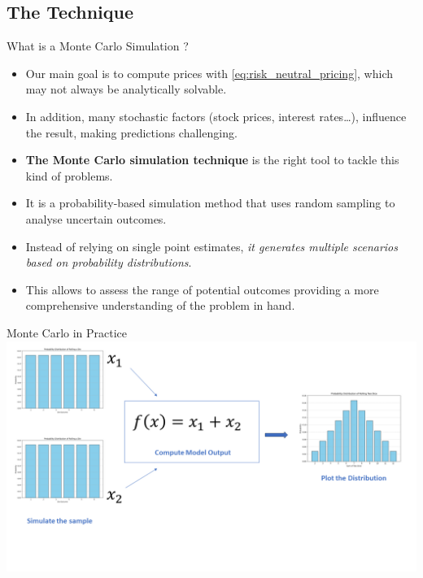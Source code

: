 \documentclass{beamer}
\begin{document}
\subsection{The Technique}
\begin{frame}{What is a Monte Carlo Simulation ?}
\begin{itemize}
	\item Our main goal is to compute prices with \cref{eq:risk_neutral_pricing}, which may not always be analytically solvable.
	\item In addition, many stochastic factors (stock prices, interest rates\ldots), influence the result, making predictions challenging. 
	\item \textbf{The Monte Carlo simulation technique} is the right tool to tackle this kind of  problems.
	\item It is a probability-based simulation method that uses random sampling to analyse uncertain outcomes.
	\item Instead of relying on single point estimates, \emph{it generates multiple scenarios based on probability distributions}. 
	\item This allows to assess the range of potential outcomes providing a more comprehensive understanding of the problem in hand.
\end{itemize}
\end{frame}

\begin{frame}{Monte Carlo in Practice}
\includegraphics[width=1.0\linewidth]{images/monte_carlo_simulation}
\end{frame}
\end{document}
